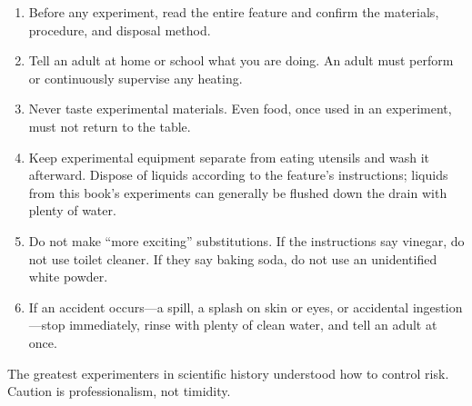 \begin{enumerate}[itemsep=2pt]
\item Before any experiment, read the entire feature and confirm the materials, procedure, and disposal method.
\item Tell an adult at home or school what you are doing. An adult must perform or continuously supervise any heating.
\item Never taste experimental materials. Even food, once used in an experiment, must not return to the table.
\item Keep experimental equipment separate from eating utensils and wash it afterward. Dispose of liquids according to the feature's instructions; liquids from this book's experiments can generally be flushed down the drain with plenty of water.
\item Do not make ``more exciting'' substitutions. If the instructions say vinegar, do not use toilet cleaner. If they say baking soda, do not use an unidentified white powder.
\item If an accident occurs---a spill, a splash on skin or eyes, or accidental ingestion---stop immediately, rinse with plenty of clean water, and tell an adult at once.
\end{enumerate}

The greatest experimenters in scientific history understood how to control risk. Caution is professionalism, not timidity.
